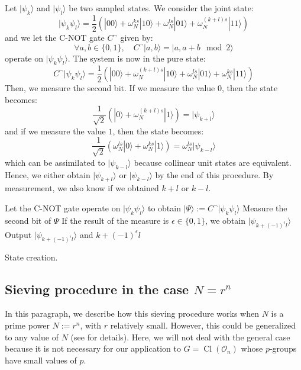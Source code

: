 \documentclass[a4paper,10pt]{report}
\theoremstyle{definition}
\theoremstyle{plain}
\theoremstyle{definition}
\newcommand{\mO}{\mathcal{O}}
\renewcommand{\(}{\left(}
\renewcommand{\)}{\right)}
\DeclareMathOperator{\Cl}{Cl}
\begin{document}
Let $|\psi_k\rangle$ and $|\psi_l\rangle$ be two sampled states. We consider the joint state:
\[|\psi_k\psi_l\rangle=\frac{1}{2}\(|00\rangle+\omega_N^{ks}|10\rangle+\omega_N^{ls}|01\rangle+\omega_N^{(k+l)s}|11\rangle\)\]
and we let the C-NOT gate $C^{\lnot}$ given by:
\[\forall a, b\in\{0,1\}, \quad C^{\lnot}|a,b\rangle=|a,a+b \mod 2\rangle\]
operate on $|\psi_k\psi_l\rangle$. The system is now in the pure state:
\[C^{\lnot}|\psi_k\psi_l\rangle=\frac{1}{2}\(|00\rangle+\omega_N^{(k+l)s}|10\rangle+\omega_N^{ls}|01\rangle+\omega_N^{ks}|11\rangle\)\]
Then, we measure the second bit. If we measure the value $0$, then the state becomes:
\[\frac{1}{\sqrt{2}}\(|0\rangle +\omega_N^{(k+l)s}|1\rangle\)=|\psi_{k+l}\rangle\]
and if we measure the value $1$, then the state becomes:
\[\frac{1}{\sqrt{2}}\(\omega_N^{ls}|0\rangle +\omega_N^{ks}|1\rangle\)=\omega_N^{ls}|\psi_{k-l}\rangle\]
which can be assimilated to $|\psi_{k-l}\rangle$ because collinear unit states are equivalent. Hence, we either obtain $|\psi_{k+l}\rangle$ or $|\psi_{k-l}\rangle$ by the end of this procedure.  By measurement, we also know if we obtained $k+l$ or $k-l$.

\begin{algorithm}[!h]\label{algorithm 13}
\SetAlgoLined
{}

Let the C-NOT gate operate on $|\psi_k\psi_l\rangle$ to obtain $|\Psi\rangle:=C^{\lnot}|\psi_k\psi_l\rangle$\;
Measure the second bit of $\Psi$\;
If the result of the measure is $\epsilon\in\{0,1\}$, we obtain $|\psi_{k+(-1)^\epsilon l}\rangle$\;
Output $|\psi_{k+(-1)^\epsilon l}\rangle$ and $k+(-1)^\epsilon l$\;

\caption{State creation.}
\end{algorithm}

\subsection{Sieving procedure in the case $N=r^n$}

In this paragraph, we describe how this sieving procedure works when $N$ is a prime power $N:=r^n$, with $r$ relatively small. However, this could be generalized to any value of $N$ (see \cite[algorithm 2]{Kuperberg} for details). Here, we will not deal with the general case because it is not necessary for our application to $G=\Cl(\mO_n)$ whose $p$-groups have small values of $p$.
\end{document}
